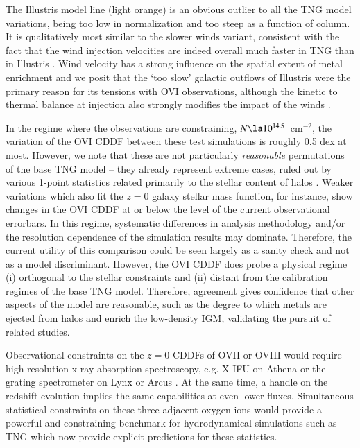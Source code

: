 \documentclass[useAMS,usenatbib]{mnras}
\newcommand{\ovi}{OVI\xspace}
\newcommand{\ovii}{OVII\xspace}
\newcommand{\oviii}{OVIII\xspace}
\begin{document}
The Illustris model line (light orange) is an obvious outlier to all the TNG model variations, being too low in normalization and too steep as a function of column. It is qualitatively most similar to the slower winds variant, consistent with the fact that the wind injection velocities are indeed overall much faster in TNG than in Illustris \citep[see Figure 6 of][]{pillepich17a}. Wind velocity has a strong influence on the spatial extent of metal enrichment \citep[as well as on the ISM metallicity;][]{torrey14} and we posit that the `too slow' galactic outflows of Illustris were the primary reason for its tensions with \ovi observations, although the kinetic to thermal balance at injection also strongly modifies the impact of the winds \citep[see also the discussion in Appendix B of][]{suresh15}.

In the regime where the observations are constraining, \mbox{$N \la 10^{14.5}$ cm$^{-2}$}, the variation of the \ovi CDDF between these test simulations is roughly 0.5 dex at most. However, we note that these are not particularly \textit{reasonable} permutations of the base TNG model -- they already represent extreme cases, ruled out by various 1-point statistics related primarily to the stellar content of halos \citep{pillepich17a}. Weaker variations which also fit the $z=0$ galaxy stellar mass function, for instance, show changes in the \ovi CDDF at or below the level of the current observational errorbars. In this regime, systematic differences in analysis methodology and/or the resolution dependence of the simulation results may dominate. Therefore, the current utility of this comparison could be seen largely as a sanity check and not as a model discriminant. However, the \ovi CDDF does probe a physical regime (i) orthogonal to the stellar constraints and (ii) distant from the calibration regimes of the base TNG model. Therefore, agreement gives confidence that other aspects of the model are reasonable, such as the degree to which metals are ejected from halos and enrich the low-density IGM, validating the pursuit of related studies.

Observational constraints on the $z=0$ CDDFs of \ovii or \oviii would require high resolution x-ray absorption spectroscopy, e.g. X-IFU on Athena \citep{barret13,kaastra13} or the grating spectrometer on Lynx \citep{weisskopf15} or Arcus \citep{smith16}. At the same time, a handle on the redshift evolution implies the same capabilities at even lower fluxes. Simultaneous statistical constraints on these three adjacent oxygen ions would provide a powerful and constraining benchmark for hydrodynamical simulations such as TNG which now provide explicit predictions for these statistics.
\end{document}
